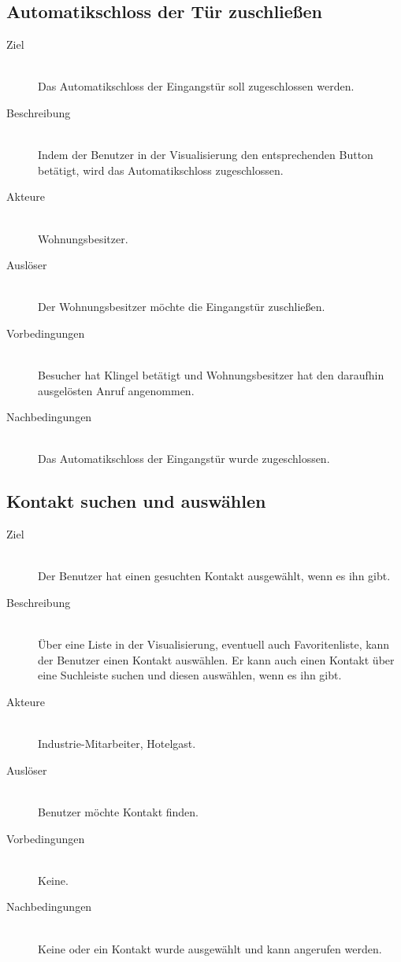 \subsection{Automatikschloss der Tür zuschließen}\label{subsec:automatikschloss-der-tür-zuschließen}
    \begin{description}
        \item[Ziel]\hfill \\
        Das Automatikschloss der Eingangstür soll zugeschlossen werden.
        \item[Beschreibung]\hfill \\
        Indem der Benutzer in der Visualisierung den entsprechenden Button betätigt, wird das Automatikschloss zugeschlossen.
        \item[Akteure]\hfill \\
        Wohnungsbesitzer.
        \item[Auslöser]\hfill \\
        Der Wohnungsbesitzer möchte die Eingangstür zuschließen.
        \item[Vorbedingungen]\hfill \\
        Besucher hat Klingel betätigt und Wohnungsbesitzer hat den daraufhin ausgelösten Anruf angenommen.
        \item[Nachbedingungen]\hfill \\
        Das Automatikschloss der Eingangstür wurde zugeschlossen.
        \end{description}

\subsection{Kontakt suchen und auswählen}\label{subsec:kontakt-suchen-und-auswählen}
    \begin{description}
        \item[Ziel]\hfill \\
        Der Benutzer hat einen gesuchten Kontakt ausgewählt, wenn es ihn gibt.
        \item[Beschreibung]\hfill \\
        Über eine Liste in der Visualisierung, eventuell auch Favoritenliste, kann der Benutzer einen Kontakt auswählen.
        Er kann auch einen Kontakt über eine Suchleiste suchen und diesen auswählen, wenn es ihn gibt.
        \item[Akteure]\hfill \\
        Industrie-Mitarbeiter, Hotelgast.
        \item[Auslöser]\hfill \\
        Benutzer möchte Kontakt finden.
        \item[Vorbedingungen]\hfill \\
        Keine.
        \item[Nachbedingungen]\hfill \\
        Keine oder ein Kontakt wurde ausgewählt und kann angerufen werden.
        \end{description}

